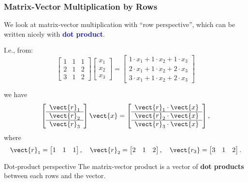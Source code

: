 \begin{frame}
  \frametitle{Matrix-Vector Multiplication {\bf by Rows}}

  We look at matrix-vector multiplication with ``row perspective'',
  which can be written nicely with \textcolor{blue}{\bf dot product}.

  {\small
  I.e., from:
  \[
  \begin{bmatrix}
    1 & 1 & 1 \\
    2 & 1 & 2 \\
    3 & 1 & 2
  \end{bmatrix}
  \begin{bmatrix}
    x_1\\
    x_2\\
    x_3
  \end{bmatrix}
  =
  \begin{bmatrix}
    1\cdot x_1 + 1\cdot x_2 + 1\cdot x_3 \\
    2\cdot x_1 + 1\cdot x_2 + 2\cdot x_3 \\
    3\cdot x_1 + 1\cdot x_2 + 2\cdot x_3
  \end{bmatrix}
  \]

  we have
  \[
  \left[
    \begin{array}{c}
      \vect{r}_1 \\
      \hline
      \vect{r}_2 \\
      \hline
      \vect{r}_3 
    \end{array}
    \right]
  \vect{x}
  =
  \left[
    \begin{array}{c}
      \vect{r}_1\cdot\vect{x} \\
      \hline
      \vect{r}_2\cdot\vect{x} \\
      \hline
      \vect{r}_3\cdot\vect{x}
    \end{array}
    \right],
  \]
  where
  \[
  \vect{r}_1=
  \begin{bmatrix}
    1 & 1 & 1
  \end{bmatrix},
  \ \ \
  \vect{r}_2=
  \begin{bmatrix}
    2 & 1 & 2
  \end{bmatrix},
  \ \ \
  \vect{r_3}=
  \begin{bmatrix}
    3 & 1 & 2
  \end{bmatrix}.
  \]
  }
  \pause
  \begin{block}{Dot-product perspective}
    {\small
    The matrix-vector product is a vector of {\bf dot products}
    between each rows and the vector.}
  \end{block}
\end{frame}
  
